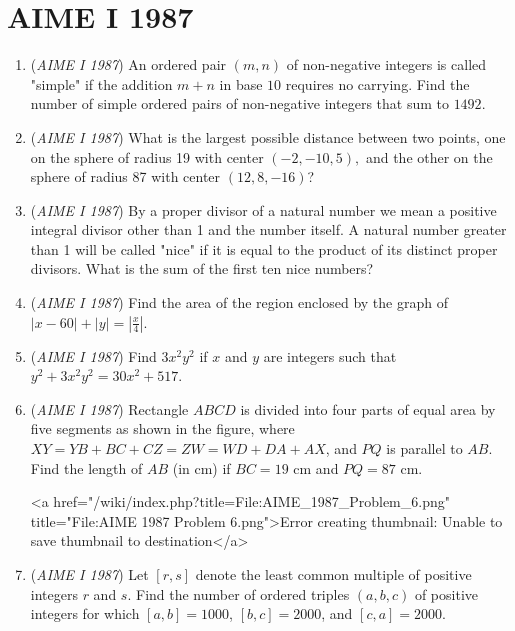 \section{AIME I 1987}
        \begin{enumerate}
        	\item (\textit{AIME I 1987}) An ordered pair $(m,n)$ of non-negative integers is called "simple" if the addition $m+n$ in base $10$ requires no carrying. Find the number of simple ordered pairs of non-negative integers that sum to $1492$. 


 

	\item (\textit{AIME I 1987}) What is the largest possible distance between two points, one on the sphere of radius 19 with center $(-2,-10,5),$ and the other on the sphere of radius 87 with center $(12,8,-16)$?


 

	\item (\textit{AIME I 1987}) By a proper divisor of a natural number we mean a positive integral divisor other than 1 and the number itself. A natural number greater than 1 will be called "nice" if it is equal to the product of its distinct proper divisors. What is the sum of the first ten nice numbers?


 

	\item (\textit{AIME I 1987}) Find the area of the region enclosed by the graph of $|x-60|+|y|=\left|\frac{x}{4}\right|.$


	\item (\textit{AIME I 1987}) Find $3x^2 y^2$ if $x$ and $y$ are integers such that $y^2 + 3x^2 y^2 = 30x^2 + 517$.


 

	\item (\textit{AIME I 1987}) Rectangle $ABCD$ is divided into four parts of equal area by five segments as shown in the figure, where $XY = YB + BC + CZ = ZW = WD + DA + AX$, and $PQ$ is parallel to $AB$.  Find the length of $AB$ (in cm) if $BC = 19$ cm and $PQ = 87$ cm.


 <a href="/wiki/index.php?title=File:AIME\_1987\_Problem\_6.png" title="File:AIME 1987 Problem 6.png">Error creating thumbnail: Unable to save thumbnail to destination</a>


	\item (\textit{AIME I 1987}) Let $[r,s]$ denote the least common multiple of positive integers $r$ and $s$.  Find the number of ordered triples $(a,b,c)$ of positive integers for which $[a,b] = 1000$, $[b,c] = 2000$, and $[c,a] = 2000$.



\end{enumerate}
